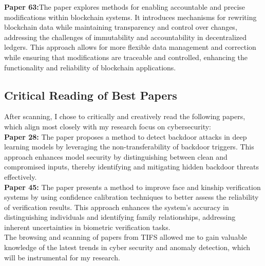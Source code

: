 \documentclass[10pt]{article}
\begin{document}
\noindent\textbf{Paper 63:}The paper explores methods for enabling accountable and precise modifications within blockchain systems. It introduces mechanisms for rewriting blockchain data while maintaining transparency and control over changes, addressing the challenges of immutability and accountability in decentralized ledgers. This approach allows for more flexible data management and correction while ensuring that modifications are traceable and controlled, enhancing the functionality and reliability of blockchain applications.

\subsection{Critical Reading of Best Papers}

After scanning, I chose to critically and creatively read the following papers, which align most closely with my research focus on cybersecurity:\\

\noindent\textbf{Paper 28:} The paper proposes a method to detect backdoor attacks in deep learning models by leveraging the non-transferability of backdoor triggers. This approach enhances model security by distinguishing between clean and compromised inputs, thereby identifying and mitigating hidden backdoor threats effectively.\\

\noindent\textbf{Paper 45:} The paper presents a method to improve face and kinship verification systems by using confidence calibration techniques to better assess the reliability of verification results. This approach enhances the system's accuracy in distinguishing individuals and identifying family relationships, addressing inherent uncertainties in biometric verification tasks.\\

\noindent  The browsing and scanning of papers from TIFS allowed me to gain valuable knowledge of the latest trends in cyber security and anomaly detection, which will be instrumental for my research.

%
\end{document}
